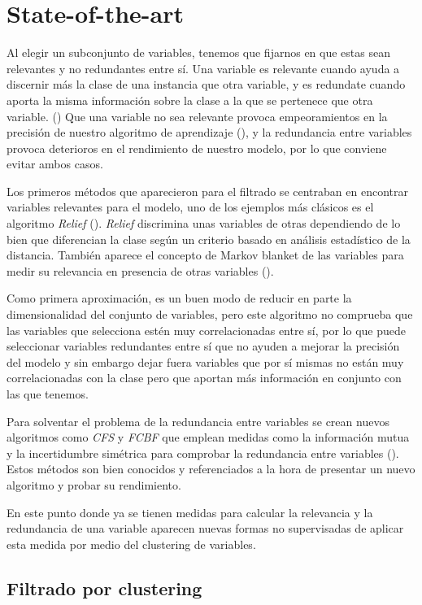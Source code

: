 \documentclass[a4paper,11pt]{article}
\begin{document}
\section{State-of-the-art}

Al elegir un subconjunto de variables, tenemos que fijarnos en que estas sean relevantes y no redundantes entre sí. Una variable es relevante cuando ayuda a discernir más la clase de una instancia que otra variable, y es redundate cuando aporta la misma información sobre la clase a la que se pertenece que otra variable. (\cite{fast})
Que una variable no sea relevante provoca empeoramientos en la precisión de nuestro algoritmo de aprendizaje (\cite{john1994}), y la redundancia entre variables provoca deterioros en el rendimiento de nuestro modelo, por lo que conviene evitar ambos casos.

Los primeros métodos que aparecieron para el filtrado se centraban en encontrar variables relevantes para el modelo, uno de los ejemplos más clásicos es el algoritmo \textit{Relief} (\cite{kira1992}). \textit{Relief} discrimina unas variables de otras dependiendo de lo bien que diferencian la clase según un criterio basado en análisis estadístico de la distancia. También aparece el concepto de Markov blanket de las variables para medir su relevancia en presencia de otras variables (\cite{mitra2002}). 

Como primera aproximación, es un buen modo de reducir en parte la dimensionalidad del conjunto de variables, pero este algoritmo no comprueba que las variables que selecciona estén muy correlacionadas entre sí, por lo que puede seleccionar variables redundantes entre sí que no ayuden a mejorar la precisión del modelo y sin embargo dejar fuera variables que por sí mismas no están muy correlacionadas con la clase pero que aportan más información en conjunto con las que tenemos.

Para solventar el problema de la redundancia entre variables se crean nuevos algoritmos como \textit{CFS} y \textit{FCBF} que emplean medidas como la información mutua y la incertidumbre simétrica para comprobar la redundancia entre variables (\cite{yu2004}). Estos métodos son bien conocidos y referenciados a la hora de presentar un nuevo algoritmo y probar su rendimiento.

En este punto donde ya se tienen medidas para calcular la relevancia y la redundancia de una variable aparecen nuevas formas no supervisadas de aplicar esta medida por medio del clustering de variables. 

\subsection{Filtrado por clustering}
\end{document}
